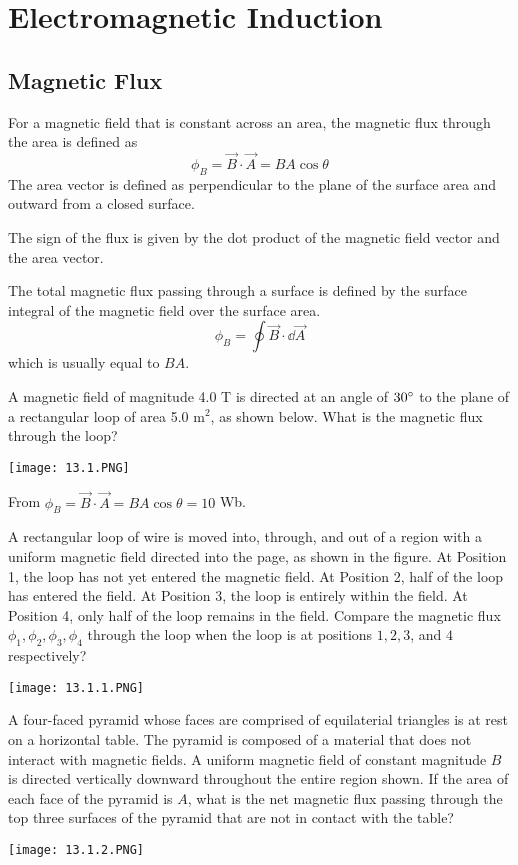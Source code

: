 \documentclass[../em.tex]{subfiles}
\begin{document}
\chapter{Electromagnetic Induction}
\section{Magnetic Flux}
For a magnetic field that is constant across an area, the magnetic flux through the area is defined as 
\[ \phi_B = \vec{B}\cdot\vec{A}=BA\cos\theta \]
The area vector is defined as perpendicular to the plane of the surface area and outward from a closed surface.

The sign of the flux is given by the dot product of the magnetic field vector and the area vector.

The total magnetic flux passing through a surface is defined by the surface integral of the magnetic field over the surface area.
\[\phi_B = \oint \vec{B}\cdot\dd\vec{A} \]
which is usually equal to $BA$.

\begin{example}
    A magnetic field of magnitude 4.0 T is directed at an angle of $30\degree$ to the plane of a rectangular loop of area 5.0 m$^2$, as shown below. What is the magnetic flux through the loop?
    \begin{center}
        \texttt{[image: 13.1.PNG]}
    \end{center}

    From $\phi_B = \vec{B}\cdot \vec{A}=BA\cos\theta = 10$ Wb.
\end{example}

\ex A rectangular loop of wire is moved into, through, and out of a region with a uniform magnetic field directed into the page, as shown in the figure. At Position 1, the loop has not yet entered the magnetic field. 
At Position 2, half of the loop has entered the field. At Position 3, the loop is entirely within the field. At Position 4, only half of the loop remains in the field. Compare the magnetic flux $\phi_1, \phi_2, \phi_3, \phi_4$ through the 
loop when the loop is at positions $1,2,3$, and $4$ respectively?
\begin{center}
    \texttt{[image: 13.1.1.PNG]}
\end{center}

\pagebreak
\ex A four-faced pyramid whose faces are comprised of equilaterial triangles is at rest on a horizontal table. The pyramid is composed of a material that does not interact with magnetic fields. A uniform magnetic field of constant magnitude $B$ 
is directed vertically downward throughout the entire region shown. If the area of each face of the pyramid is $A$, what is the net magnetic flux passing through the top three surfaces of the pyramid that are not in contact with the table?
\begin{center}
    \texttt{[image: 13.1.2.PNG]}
\end{center}
\end{document}
